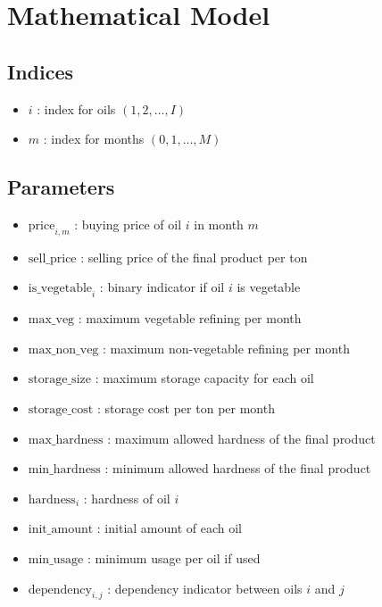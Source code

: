 \documentclass{article}
\begin{document}
\section*{Mathematical Model}

\subsection*{Indices}
\begin{itemize}
    \item \( i \) : index for oils \( (1, 2, \ldots, I) \)
    \item \( m \) : index for months \( (0, 1, \ldots, M) \)
\end{itemize}

\subsection*{Parameters}
\begin{itemize}
    \item \( \text{price}_{i,m} \) : buying price of oil \( i \) in month \( m \)
    \item \( \text{sell\_price} \) : selling price of the final product per ton
    \item \( \text{is\_vegetable}_{i} \) : binary indicator if oil \( i \) is vegetable
    \item \( \text{max\_veg} \) : maximum vegetable refining per month
    \item \( \text{max\_non\_veg} \) : maximum non-vegetable refining per month
    \item \( \text{storage\_size} \) : maximum storage capacity for each oil
    \item \( \text{storage\_cost} \) : storage cost per ton per month
    \item \( \text{max\_hardness} \) : maximum allowed hardness of the final product
    \item \( \text{min\_hardness} \) : minimum allowed hardness of the final product
    \item \( \text{hardness}_{i} \) : hardness of oil \( i \)
    \item \( \text{init\_amount} \) : initial amount of each oil
    \item \( \text{min\_usage} \) : minimum usage per oil if used
    \item \( \text{dependency}_{i,j} \) : dependency indicator between oils \( i \) and \( j \)
\end{itemize}
\end{document}
